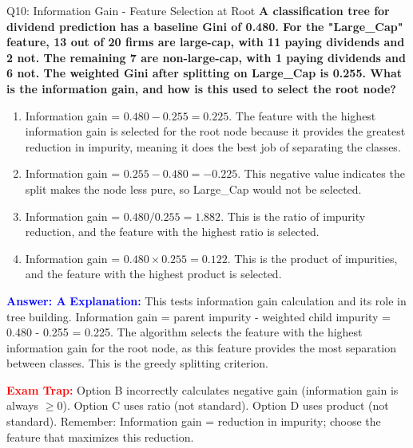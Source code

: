 \documentclass[8pt]{beamer}
\begin{document}
	\begin{frame}{Q10: Information Gain - Feature Selection at Root}
		\fontsize{6.5}{7.5}\selectfont
		\textbf{A classification tree for dividend prediction has a baseline Gini of 0.480. For the "Large\_Cap" feature, 13 out of 20 firms are large-cap, with 11 paying dividends and 2 not. The remaining 7 are non-large-cap, with 1 paying dividends and 6 not. The weighted Gini after splitting on Large\_Cap is 0.255. What is the information gain, and how is this used to select the root node?}
		
		\begin{enumerate}
			\item Information gain = $0.480 - 0.255 = 0.225$. The feature with the highest information gain is selected for the root node because it provides the greatest reduction in impurity, meaning it does the best job of separating the classes.
			\item Information gain = $0.255 - 0.480 = -0.225$. This negative value indicates the split makes the node less pure, so Large\_Cap would not be selected.
			\item Information gain = $0.480 / 0.255 = 1.882$. This is the ratio of impurity reduction, and the feature with the highest ratio is selected.
			\item Information gain = $0.480 \times 0.255 = 0.122$. This is the product of impurities, and the feature with the highest product is selected.
		\end{enumerate}
		
		\vspace{0.1cm}
		\textcolor{blue}{\textbf{Answer: A}}
		\vspace{0.1cm}
		\textcolor{blue}{\textbf{Explanation:}} This tests information gain calculation and its role in tree building. Information gain = parent impurity - weighted child impurity = 0.480 - 0.255 = 0.225. The algorithm selects the feature with the highest information gain for the root node, as this feature provides the most separation between classes. This is the greedy splitting criterion.
		
		\textcolor{red}{\textbf{Exam Trap:}} Option B incorrectly calculates negative gain (information gain is always $\geq 0$). Option C uses ratio (not standard). Option D uses product (not standard). Remember: Information gain = reduction in impurity; choose the feature that maximizes this reduction.
	\end{frame}
	
\end{document}
